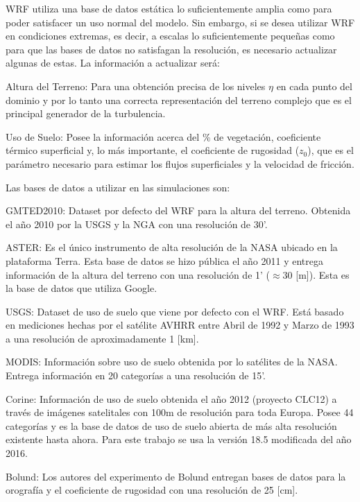 WRF utiliza una base de datos estática lo suficientemente amplia como para poder satisfacer un uso normal del modelo. Sin embargo, si se desea utilizar WRF en condiciones extremas, es decir, a escalas lo suficientemente pequeñas como para que las bases de datos no satisfagan la resolución, es necesario actualizar algunas de estas. La información a actualizar será:
\begin{itemize*}
	\item Altura del Terreno: Para una obtención precisa de los niveles $\eta$ en cada punto del dominio y por lo tanto una correcta representación del terreno complejo que es el principal generador de la turbulencia.
	\item Uso de Suelo: Posee la información acerca del \% de vegetación, coeficiente térmico superficial y, lo más importante, el coeficiente de rugosidad ($z_0$), que es el parámetro necesario para estimar los flujos superficiales y la velocidad de fricción.
\end{itemize*}
Las bases de datos a utilizar en las simulaciones son:
\begin{itemize*}
	\item GMTED2010: Dataset por defecto del WRF para la altura del terreno. Obtenida el año 2010 por la USGS y la NGA con una resolución de 30'.
	\item ASTER: Es el único instrumento de alta resolución de la NASA ubicado en la plataforma Terra. Esta base de datos se hizo pública el año 2011 y entrega información de la altura del terreno con una resolución de 1' ($\approx 30$ [m]). Esta es la base de datos que utiliza Google.
	\item USGS: Dataset de uso de suelo que viene por defecto con el WRF. Está basado en mediciones hechas por el satélite AVHRR entre Abril de 1992 y Marzo de 1993 a una resolución de aproximadamente 1 [km].
	\item MODIS: Información sobre uso de suelo obtenida por lo satélites de la NASA. Entrega información en 20 categorías a una resolución de 15'.
	\item Corine: Información de uso de suelo obtenida el año 2012 (proyecto CLC12) a través de imágenes satelitales con 100m de resolución para toda Europa. Posee 44 categorías y es la base de datos de uso de suelo abierta de más alta resolución existente hasta ahora. Para este trabajo se usa la versión 18.5 modificada del año 2016.
	\item Bolund: Los autores del experimento de Bolund entregan bases de datos para la orografía y el coeficiente de rugosidad con una resolución de 25 [cm].
\end{itemize*}
